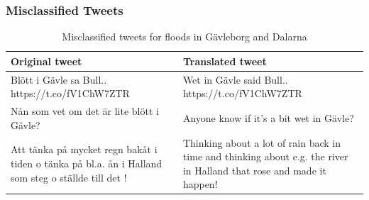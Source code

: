 \documentclass{beamer}
\begin{document}
\begin{frame}
  \frametitle{Misclassified Tweets}
\begin{table}
  \center
  \caption{Misclassified tweets for floods in Gävleborg and Dalarna}
  \begin{tabular}{|L{5cm}|L{5cm}|}
    \hline
    Original tweet & Translated tweet\\
    \hline
    Blött i Gävle sa Bull.. https://t.co/fV1ChW7ZTR &
    Wet in Gävle said Bull.. https://t.co/fV1ChW7ZTR \\
    \hline
    Nån som vet om det är lite blött i Gävle?&
    Anyone know if it's a bit wet in Gävle? \\
    \hline
    Att tänka på mycket regn bakåt i tiden o tänka på bl.a. ån i Halland som steg o ställde till det !&
    Thinking about a lot of rain back in time and thinking about e.g. the river in Halland that rose and
    made it happen! \\
    \hline
  \end{tabular}
\end{table}
\end{frame}
\end{document}
